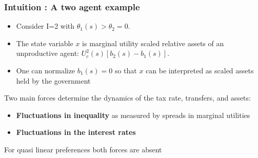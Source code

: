 \documentclass{beamer}
\begin{document}
\begin{frame}
\frametitle{Intuition :  A two agent example}

\begin{itemize}
 \item Consider I=2 with $\theta_1(s)>\theta_2=0$.
 \item The state variable $x$ is marginal utility scaled relative assets of an unproductive agent: $U^2_c(s)[b_{2}(s)-b_{1}(s)]$.
 \item One can normalize $b_{1}(s)=0$ so that $x$  can be interpreted as scaled assets held by the government
 \end{itemize}

Two main forces determine the dynamics of the tax rate, transfers,  and assets:
\begin{itemize}
 \item \textbf{Fluctuations in inequality} as measured by spreads in marginal utilities
\item  \textbf{Fluctuations in the interest rates  }
\end{itemize}
For quasi linear preferences both forces are absent

\end{frame}
\end{document}

